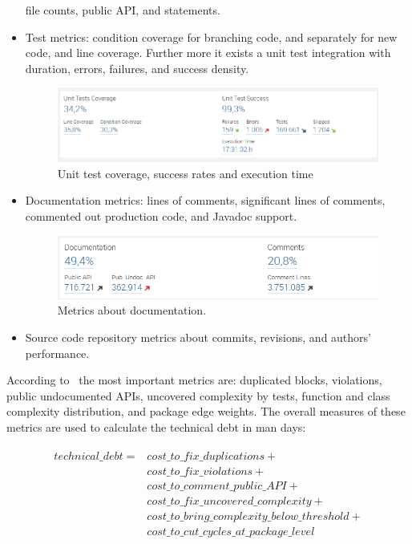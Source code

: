 \begin{itemize}
	file counts, public API, and statements.
	\item Test metrics: condition coverage for branching code, and separately 
	for new code, and line coverage. Further more it exists a unit test 
	integration with duration, errors, failures, and success density.
	\begin{figure}[h]
		\centering
		\includegraphics[scale=0.5]{img/unit_test_coverage.jpg}
		\caption{Unit test coverage, success rates and execution time} 
		\label{fig:unit_test_coverage}
	\end{figure}
	\item Documentation metrics: lines of comments, significant lines of comments, commented out production code, and Javadoc support.
	\begin{figure}[h]
		\centering
		\includegraphics[scale=0.5]{img/documentation.jpg}
		\caption{Metrics about documentation.} 
		\label{fig:documentation}
	\end{figure}
	\item Source code repository metrics about commits, revisions, and authors'
	performance.
\end{itemize}

According to~\cite{sonar_metrics_slideshare} the most important metrics are: duplicated blocks, violations,
public undocumented APIs, uncovered complexity by tests, function and class
complexity distribution, and package edge weights.
The overall measures of these metrics are used to calculate the technical debt
in man days:

\begin{align}
	\begin{split}
		\label{eq:technical_debt_in_man_days}
		technical\_debt = & cost\_to\_fix\_duplications + \\
		 	& cost\_to\_fix\_violations + \\
		 	& cost\_to\_comment\_public\_API + \\
		 	& cost\_to\_fix\_uncovered\_complexity + 	\\
		 	& cost\_to\_bring\_complexity\_below\_threshold +\\
		 	& cost\_to\_cut\_cycles\_at\_package\_level
	\end{split}
\end{align}

